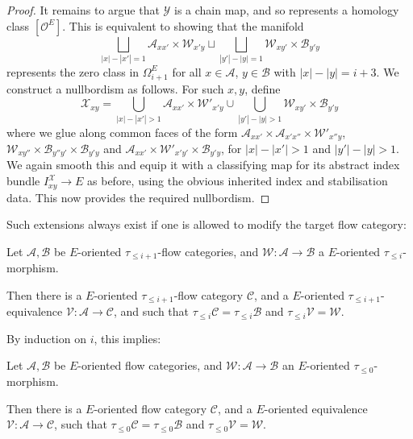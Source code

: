 \documentclass{TPmod}
\newcommand{\cA}{\mathcal{A}}
\newcommand{\cB}{\mathcal{B}}
\newcommand{\cC}{\mathcal{C}}
\newcommand{\cO}{\mathcal{O}}
\newcommand{\cV}{\mathcal{V}}
\newcommand{\cW}{\mathcal{W}}
\newcommand{\cX}{\mathcal{X}}
\newcommand{\cY}{\mathcal{Y}}
\numberwithin{equation}{section}
\begin{document}
\begin{proof}
        It remains to argue that $\cY$ is a chain map, and so represents a homology class $[\cO^E]$. This is equivalent to showing that the manifold
        \begin{equation}
            \bigsqcup\limits_{|x|-|x'|=1} \cA_{xx'} \times \cW_{x'y} \sqcup \bigsqcup\limits_{|y'|-|y|=1} \cW_{xy'} \times \cB_{y'y}
        \end{equation}
        represents the zero class in $\Omega^{E}_{i+1}$ for all $x \in \cA$, $y \in \cB$ with $|x|-|y|=i+3$. We construct a nullbordism as follows. For such $x,y$, define
        \begin{equation}
            \cX_{xy} = \bigcup\limits_{|x|-|x'|>1} \cA_{xx'} \times \cW'_{x'y} \cup \bigcup\limits_{|y'|-|y|>1} \cW_{xy'} \times \cB_{y'y}
        \end{equation}
        where we glue along common faces of the form $\cA_{xx'} \times \cA_{x'x''} \times \cW'_{x''y}$, $\cW_{xy''} \times \cB_{y''y'} \times \cB_{y'y}$ and $\cA_{xx'} \times \cW'_{x'y'} \times \cB_{y'y}$, for $|x|-|x'|>1$ and $|y'|-|y|>1$. We again smooth this and equip it with a classifying map for its abstract index  bundle $I^\cX_{xy} \to E$ as before, using the obvious inherited index and stabilisation data. This now provides the required nullbordism.
    \end{proof}
    Such extensions always exist if one is allowed to modify the target flow category:
    \begin{prop}\label{prop: truncation modification}
        Let $\cA, \cB$ be $E$-oriented $\tau_{\leq i+1}$-flow categories, and $\cW: \cA \to \cB$ a $E$-oriented $\tau_{\leq i}$-morphism.

        Then there is a $E$-oriented $\tau_{\leq i+1}$-flow category $\cC$, and a $E$-oriented $\tau_{\leq i+1}$-equivalence $\cV: \cA \to \cC$, and such that $\tau_{\leq i} \cC = \tau_{\leq i} \cB$ and $\tau_{\leq i} \cV = \cW$.
    \end{prop}
    By induction on $i$, this implies:
    \begin{cor}\label{cor:replace 0 truncation}
        Let $\cA, \cB$ be $E$-oriented flow categories, and $\cW: \cA \to \cB$ an $E$-oriented $\tau_{\leq 0}$-morphism.

        Then there is a $E$-oriented flow category $\cC$, and a $E$-oriented equivalence $\cV: \cA \to \cC$, such that $\tau_{\leq 0}\cC = \tau_{\leq 0}\cB$ and $\tau_{\leq 0}\cV = \cW$.
    \end{cor}
    
\end{document}
